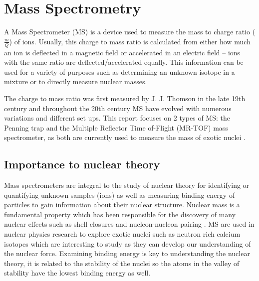 \section{Mass Spectrometry}
A Mass Spectrometer (MS) is a device used to measure the mass to charge ratio ($\frac{m}{Q}$) of ions.
Usually, this charge to mass ratio is calculated from either how much an ion is deflected in a magnetic field or accelerated in an electric field – ions with the same ratio are deflected/accelerated equally.
This information can be used for a variety of purposes such as determining an unknown isotope in a mixture or to directly measure nuclear masses.

The charge to mass ratio was first measured by J. J. Thomson in the late 19th century \cite{noauthor_j_nodate} and throughout the 20th century MS have evolved with numerous variations and different set ups.
This report focuses on 2 types of MS: the Penning trap and the Multiple Reflector Time of-Flight (MR-TOF) mass spectrometer, as both are currently used to measure the mass of exotic nuclei \cite{famiano_nuclear_2019}.

\subsection{Importance to nuclear theory}
Mass spectrometers are integral to the study of nuclear theory for identifying or quantifying unknown samples (ions) as well as measuring binding energy of particles to gain information about their nuclear structure.
Nuclear mass is a fundamental property which has been responsible for the discovery of many nuclear effects such as shell closures and nucleon-nucleon pairing \cite{blaum_precision_2012}.
MS are used in nuclear physics research to explore exotic nuclei such as neutron rich calcium isotopes \cite{wienholtz} which are interesting to study as they can develop our understanding of the nuclear force.
Examining binding energy is key to understanding the nuclear theory, it is related to the stability of the nuclei so the atoms in the valley of stability have the lowest binding energy as well.

